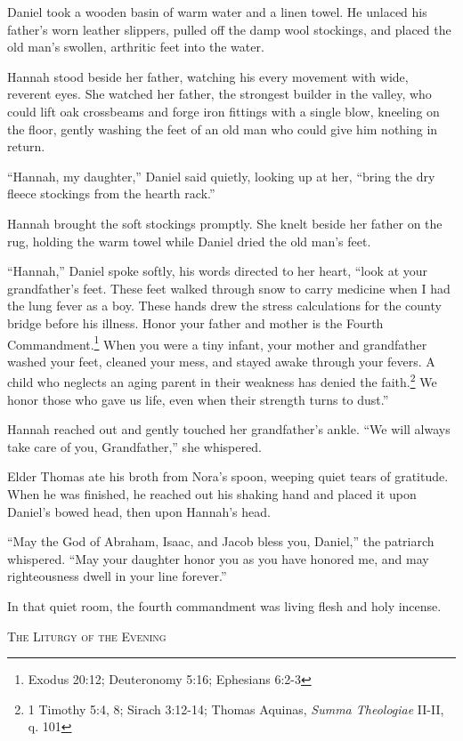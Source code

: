 \documentclass[11pt]{article}
\begin{document}
Daniel took a wooden basin of warm water and a linen towel. He unlaced his father's worn leather slippers, pulled off the damp wool stockings, and placed the old man's swollen, arthritic feet into the water.

Hannah stood beside her father, watching his every movement with wide, reverent eyes. She watched her father, the strongest builder in the valley, who could lift oak crossbeams and forge iron fittings with a single blow, kneeling on the floor, gently washing the feet of an old man who could give him nothing in return.

``Hannah, my daughter,'' Daniel said quietly, looking up at her, ``bring the dry fleece stockings from the hearth rack.''

Hannah brought the soft stockings promptly. She knelt beside her father on the rug, holding the warm towel while Daniel dried the old man's feet.

``Hannah,'' Daniel spoke softly, his words directed to her heart, ``look at your grandfather's feet. These feet walked through snow to carry medicine when I had the lung fever as a boy. These hands drew the stress calculations for the county bridge before his illness. Honor your father and mother is the Fourth Commandment.\footnote{Exodus 20:12; Deuteronomy 5:16; Ephesians 6:2-3} When you were a tiny infant, your mother and grandfather washed your feet, cleaned your mess, and stayed awake through your fevers. A child who neglects an aging parent in their weakness has denied the faith.\footnote{1 Timothy 5:4, 8; Sirach 3:12-14; Thomas Aquinas, \textit{Summa Theologiae} II-II, q. 101} We honor those who gave us life, even when their strength turns to dust.''

Hannah reached out and gently touched her grandfather's ankle. ``We will always take care of you, Grandfather,'' she whispered.

Elder Thomas ate his broth from Nora's spoon, weeping quiet tears of gratitude. When he was finished, he reached out his shaking hand and placed it upon Daniel's bowed head, then upon Hannah's head.

``May the God of Abraham, Isaac, and Jacob bless you, Daniel,'' the patriarch whispered. ``May your daughter honor you as you have honored me, and may righteousness dwell in your line forever.''

In that quiet room, the fourth commandment was living flesh and holy incense.

\newpage

\begin{center}
    {\scshape\large The Liturgy of the Evening}\par
    \vspace{0.2in}
\end{center}
\end{document}
